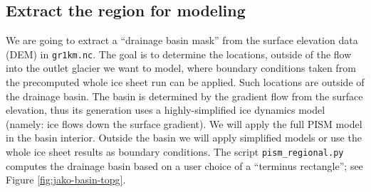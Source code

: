 \subsection*{Extract the region for modeling}
We are going to extract a ``drainage basin mask'' from the surface elevation data (DEM) in \texttt{gr1km.nc}.  The goal is to determine the locations, outside of the flow into the outlet glacier we want to model, where boundary conditions taken from the precomputed whole ice sheet run can be applied.  Such locations are outside of the drainage basin.  The basin is determined by the gradient flow from the surface elevation, thus its generation uses a highly-simplified ice dynamics model (namely: ice flows down the surface gradient).  We will apply the full PISM model in the basin interior.  Outside the basin we will apply simplified models or use the whole ice sheet results as boundary conditions.  The script \texttt{pism_regional.py} computes the drainage basin based on a user choice of a ``terminus rectangle''; see Figure \ref{fig:jako-basin-topg}.  
